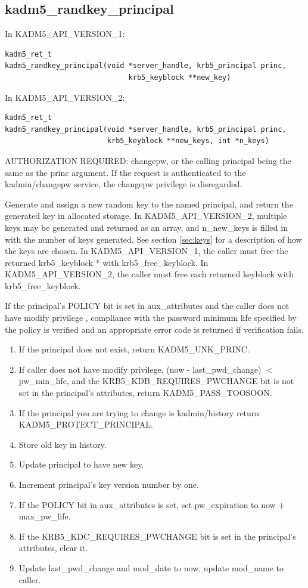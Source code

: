 \subsection{kadm5_randkey_principal}

In KADM5_API_VERSION_1:

\begin{verbatim}
kadm5_ret_t
kadm5_randkey_principal(void *server_handle, krb5_principal princ,
                             krb5_keyblock **new_key)
\end{verbatim}

In KADM5_API_VERSION_2:

\begin{verbatim}
kadm5_ret_t
kadm5_randkey_principal(void *server_handle, krb5_principal princ,
                        krb5_keyblock **new_keys, int *n_keys)
\end{verbatim}

AUTHORIZATION REQUIRED: changepw, or the calling principal being the
same as the princ argument.  If the request is authenticated to the
kadmin/changepw service, the changepw privilege is disregarded.

Generate and assign a new random key to the named principal, and
return the generated key in allocated storage.  In
KADM5_API_VERSION_2, multiple keys may be generated and returned as an
array, and n_new_keys is filled in with the number of keys generated.
See section \ref{sec:keys} for a description of how the keys are
chosen.  In KADM5_API_VERSION_1, the caller must free the returned
krb5_keyblock * with krb5_free_keyblock.  In KADM5_API_VERSION_2, the
caller must free each returned keyblock with krb5_free_keyblock.

If the principal's POLICY bit is set in aux_attributes and the caller does
not have modify privilege , compliance with the password minimum life
specified by the policy is verified and an appropriate error code is returned
if verification fails.

\begin{enumerate}
\item If the principal does not exist, return KADM5_UNK_PRINC.
\item If caller does not have modify privilege, (now - last_pwd_change) $<$
pw_min_life, and the KRB5_KDB_REQUIRES_PWCHANGE bit is not set in the
principal's attributes, return KADM5_PASS_TOOSOON.
\item If the principal you are trying to change is kadmin/history return
KADM5_PROTECT_PRINCIPAL.
\item Store old key in history.
\item Update principal to have new key.
\item Increment principal's key version number by one.
\item If the POLICY bit in aux_attributes is set, set pw_expiration to
now + max_pw_life.
\item If the KRB5_KDC_REQUIRES_PWCHANGE bit is set in the principal's
attributes, clear it.
\item Update last_pwd_change and mod_date to now, update mod_name to
caller.
\end{enumerate}


